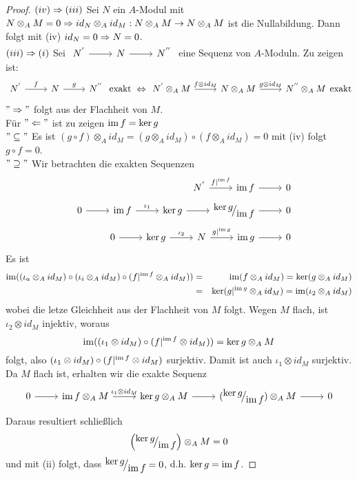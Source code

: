\begin{proof}
	$(iv) \Rightarrow (iii) $ Sei $N$ ein $A$-Modul mit $N \otimes_A M = 0 \Rightarrow id_N \otimes_A id_M: N \otimes_AM \to N \otimes_A M $ ist die Nullabildung. Dann folgt mit (iv) $id_N = 0 \Rightarrow N = 0 $. \\
	$(iii) \Rightarrow (i) $ Sei $\begin{tikzcd} N^{'} \arrow{r} & N \arrow{r} & N^{''} \end{tikzcd}$ eine Sequenz von $A$-Moduln. Zu zeigen ist: 
	$$\begin{tikzcd} N^{'} \arrow{r}{f} & N \arrow{r}{g} & N^{''} \end{tikzcd} \text{ exakt }\Lra \begin{tikzcd} N^{'} \otimes_A M  \arrow{r}{f \otimes id_M} & N \otimes_A M  \arrow{r}{g \otimes id_M} & N^{''} \otimes_A M  \end{tikzcd} \text {exakt}$$
	$"\Rightarrow "$ folgt aus der Flachheit von $M$. \\
	Für $"\Leftarrow "$ ist zu zeigen $ \operatorname{im} f = \ker g $ \\
	$"\subseteq " $ Es ist $(g \circ f) \otimes_A id_M = (g \otimes_A id_M) \circ (f \otimes_A id_M ) = 0$  mit (iv) folgt $g \circ f = 0 $. \\
	$"\supseteq " $ Wir betrachten die exakten Sequenzen \begin{eqnarray*}
		&&\begin{tikzcd} N^{'} \arrow{r}{f|^{\im f}} & \im f \arrow{r} & 0 \end{tikzcd}\\
		&&\begin{tikzcd} 0 \arrow{r}  & \im f \arrow{r}{\iota_1} & \ker g \arrow{r} & \QR{\ker g}{\im f} \arrow{r} & 0 \end{tikzcd} \\
		& &\begin{tikzcd} 0 \arrow{r}  & \ker g \arrow{r}{\iota_2} & N \arrow{r}{g|^{\im g}} & \im g \arrow{r} & 0 \end{tikzcd}
	\end{eqnarray*}
	Es ist \begin{eqnarray*}
		\operatorname{im} ((\iota_a \otimes_A id_M) \circ (\iota_i \otimes_A id_M) \circ (f|^{\operatorname{im} f} \otimes_A id_M )) &=& \operatorname{im}(f \otimes_A id_M) = \ker(g \otimes_A id_M) \\
		&=& \ker(g|^{\operatorname{im} g} \otimes_A  id_M) = \operatorname{im}(\iota_2 \otimes_A id_M)
	\end{eqnarray*}
	wobei die letze Gleichheit aus der Flachheit von $M$ folgt. Wegen $M$ flach, ist $\iota_2 \otimes id_M $ injektiv, woraus $$\operatorname{im} ((\iota_1 \otimes id_M) \circ (f|^{\operatorname{im} f} \otimes id_M)) = \ker g \otimes_A M$$ folgt, also 
	$(\iota_1 \otimes id_M ) \circ (f|^{\operatorname{im} f} \otimes id_M) $ surjektiv.
	Damit ist auch $\iota_1 \otimes id_M $ surjektiv. Da $M$ flach ist, erhalten wir die exakte Sequenz $$ \begin{tikzcd} 0 \arrow{r}  & \im f \otimes_A M \arrow{r}{\iota_1 \otimes id_M } & \ker g \otimes_A M \arrow{r} & (\QR{\ker g}{\im f}) \otimes_A M \arrow{r} & 0 \end{tikzcd}$$
	 Daraus resultiert schließlich
	 $$\left(\QR{\ker g}{\im f}\right) \otimes_A M = 0$$ und mit (ii) folgt, dass $\QR{\ker g}{\im f} = 0$, d.h. $\ker g = \operatorname{im} f $.
\end{proof}

